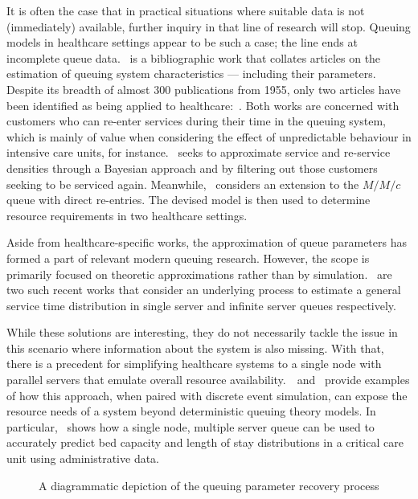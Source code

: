 It is often the case that in practical situations where suitable data is not
(immediately) available, further inquiry in that line of research will stop.
Queuing models in healthcare settings appear to be such a case; the line ends at
incomplete queue data.~\cite{Asanjarani2017} is a bibliographic work that
collates articles on the estimation of queuing system characteristics ---
including their parameters. Despite its breadth of almost 300 publications from
1955, only two articles have been identified as being applied to
healthcare:~\cite{Mohammadi2012,Yom2014}. Both works are concerned with
customers who can re-enter services during their time in the queuing system,
which is mainly of value when considering the effect of unpredictable behaviour
in intensive care units, for instance.~\cite{Mohammadi2012} seeks to approximate
service and re-service densities through a Bayesian approach and by filtering
out those customers seeking to be serviced again. Meanwhile,~\cite{Yom2014}
considers an extension to the \(M/M/c\) queue with direct re-entries. The
devised model is then used to determine resource requirements in two healthcare
settings.

Aside from healthcare-specific works, the approximation of queue parameters has
formed a part of relevant modern queuing research. However, the scope is
primarily focused on theoretic approximations rather than by
simulation.~\cite{Djabali2018,Goldenshluger2016} are two such recent works that
consider an underlying process to estimate a general service time distribution
in single server and infinite server queues respectively.

While these solutions are interesting, they do not necessarily tackle the issue
in this scenario where information about the system is also missing. With that,
there is a precedent for simplifying healthcare systems to a single node with
parallel servers that emulate overall resource
availability.~\cite{Steins2013}~and~\cite{Williams2015} provide examples of how
this approach, when paired with discrete event simulation, can expose the
resource needs of a system beyond deterministic queuing theory models. In
particular,~\cite{Williams2015} shows how a single node, multiple server queue
can be used to accurately predict bed capacity and length of stay distributions
in a critical care unit using administrative data.

\begin{figure}
    \centering%
    \resizebox{!}{.9\textheight}{%
        
    }
    \caption{%
        A diagrammatic depiction of the queuing parameter recovery process
    }\label{fig:process}
\end{figure}

